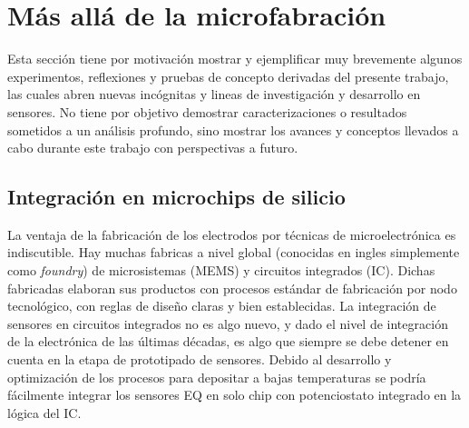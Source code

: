 

\section{Más allá de la microfabración}
	
	  Esta sección tiene por motivación mostrar y ejemplificar muy brevemente algunos experimentos, reflexiones y pruebas de concepto derivadas del presente trabajo, las cuales abren nuevas incógnitas y lineas de investigación y desarrollo en sensores. No tiene por objetivo demostrar caracterizaciones o resultados sometidos a un análisis profundo, sino mostrar los avances y conceptos llevados a cabo durante este trabajo con perspectivas a futuro.

	\subsection{Integración en microchips de silicio}

	  La ventaja de la fabricación de los electrodos por técnicas de microelectrónica es indiscutible. Hay muchas fabricas a nivel global (conocidas en ingles simplemente como \textit{foundry}) de microsistemas (MEMS) y circuitos integrados (IC). Dichas fabricadas elaboran sus productos con procesos estándar de fabricación por nodo tecnológico, con reglas de diseño claras y bien establecidas. La integración de sensores en circuitos integrados no es algo nuevo, y dado el nivel de integración de la electrónica de las últimas décadas, es algo que siempre se debe detener en cuenta en la etapa de prototipado de sensores.\cite{Wang2012,Liu1993,Novell2012,Yu2013,Sarkar2014} Debido al desarrollo y optimización de los procesos para depositar \pdm\space a bajas temperaturas se podría fácilmente integrar los sensores EQ en solo chip con potenciostato integrado en la lógica del IC.
 	
